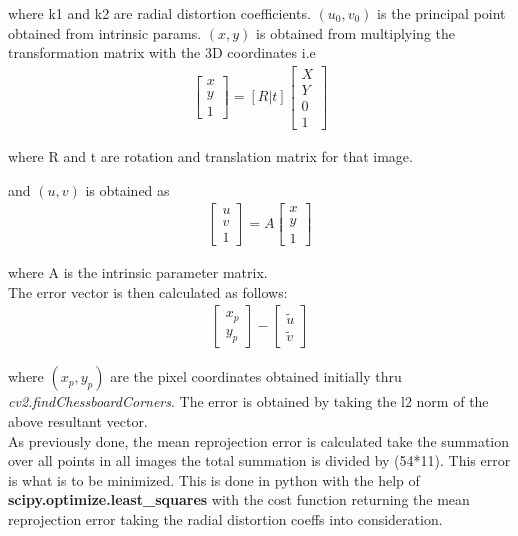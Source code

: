 \documentclass[conference]{IEEEtran}
\begin{document}
where k1 and k2 are radial distortion coefficients. $(u_0, v_0)$ is the principal point obtained from intrinsic params. $(x, y)$ is obtained from multiplying the transformation matrix with the 3D coordinates i.e
\begin{gather}
 \begin{bmatrix} x \\ y \\ 1\end{bmatrix}
 =
 [R | t]
  \begin{bmatrix}
    X \\ Y \\ 0 \\ 1
   \end{bmatrix}
\end{gather}

where R and t are rotation and translation matrix for that image.

and $(u, v)$ is obtained as 
\begin{gather}
 \begin{bmatrix} u \\ v \\ 1\end{bmatrix}
 =
 A
  \begin{bmatrix}
    x \\ y \\ 1 
   \end{bmatrix}
\end{gather}

where A is the intrinsic parameter matrix. \\

The error vector is then calculated as follows:
\begin{gather}
 \begin{bmatrix} x_p \\ y_p \end{bmatrix} -
  \begin{bmatrix}
    \widetilde{u} \\ \widetilde{v}
   \end{bmatrix}
\end{gather}


where $(x_p, y_p)$ are the pixel coordinates obtained initially thru \textit{cv2.findChessboardCorners}. The error is obtained by taking the l2 norm of the above resultant vector. \\

As previously done, the mean reprojection error is calculated take the summation over all points in all images the total summation is divided by (54*11). This error is what is to be minimized. This is done in python with the help of \textbf{scipy.optimize.least\_squares} with the cost function returning the mean reprojection error taking the radial distortion coeffs into consideration. \\
\end{document}
